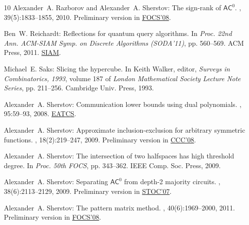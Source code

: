 \begin{thebibliography}{10}
{\sc Alexander~A. Razborov and Alexander~A. Sherstov}: The sign-rank of
  {$\mathsf{AC}^0$}.
, 39(5):1833--1855, 2010.
\newblock Preliminary version in
  \href{http://dx.doi.org/10.1109/FOCS.2008.19}{FOCS'08}.
\newblock [\epfmtdoi{10.1137/080744037}]

{\sc Ben~W. Reichardt}: Reflections for quantum query algorithms.
\newblock In {\em Proc. 22nd Ann. ACM-SIAM Symp. on Discrete Algorithms
  (SODA'11)}, pp. 560--569. ACM Press, 2011.
\newblock
  \href{https://www.siam.org/proceedings/soda/2011/SODA11_044_reichardtb.pdf}{SIAM}.

{\sc Michael~E. Saks}: Slicing the hypercube.
\newblock In {\sc Keith Walker}, editor, {\em Surveys in Combinatorics, 1993},
  volume 187 of {\em London Mathematical Society Lecture Note Series}, pp.
  211--256. Cambridge Univ. Press, 1993.

{\sc Alexander~A. Sherstov}: Communication lower bounds using dual polynomials.
, 95:59--93, 2008.
\newblock \href{http://www.eatcs.org/images/bulletin/beatcs95.pdf}{EATCS}.

{\sc Alexander~A. Sherstov}: Approximate inclusion-exclusion for arbitrary
  symmetric functions.
, 18(2):219--247, 2009.
\newblock Preliminary version in
  \href{http://dx.doi.org/10.1109/CCC.2008.18}{CCC'08}.
\newblock [\epfmtdoi{10.1007/s00037-009-0274-4}]

{\sc Alexander~A. Sherstov}: The intersection of two halfspaces has high
  threshold degree.
\newblock In {\em Proc. 50th FOCS}, pp. 343--362. IEEE Comp. Soc. Press, 2009.

{\sc Alexander~A. Sherstov}: Separating {$\mathsf{AC}^0$} from depth-2 majority
  circuits.
, 38(6):2113--2129, 2009.
\newblock Preliminary version in
  \href{http://dx.doi.org/10.1145/1250790.1250834}{STOC'07}.
\newblock [\epfmtdoi{10.1137/08071421X}]

{\sc Alexander~A. Sherstov}: The pattern matrix method.
, 40(6):1969--2000, 2011.
\newblock Preliminary version in
  \href{http://dx.doi.org/10.1145/1374376.1374392}{FOCS'08}.
\newblock [\epfmtdoi{10.1137/080733644}]


\end{thebibliography}
